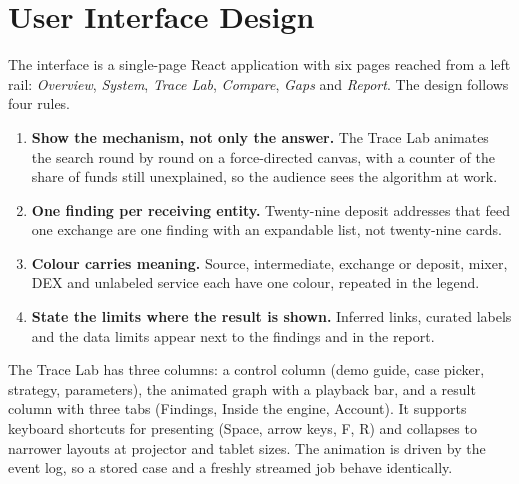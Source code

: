\section{User Interface Design}
\label{sec:design-group}
The interface is a single-page React application with six pages reached from a left rail: \emph{Overview}, \emph{System}, \emph{Trace Lab}, \emph{Compare}, \emph{Gaps} and \emph{Report}. The design follows four rules.
\begin{enumerate}
\item \textbf{Show the mechanism, not only the answer.} The Trace Lab animates the search round by round on a force-directed canvas, with a counter of the share of funds still unexplained, so the audience sees the algorithm at work.
\item \textbf{One finding per receiving entity.} Twenty-nine deposit addresses that feed one exchange are one finding with an expandable list, not twenty-nine cards.
\item \textbf{Colour carries meaning.} Source, intermediate, exchange or deposit, mixer, DEX and unlabeled service each have one colour, repeated in the legend.
\item \textbf{State the limits where the result is shown.} Inferred links, curated labels and the data limits appear next to the findings and in the report.
\end{enumerate}
The Trace Lab has three columns: a control column (demo guide, case picker, strategy, parameters), the animated graph with a playback bar, and a result column with three tabs (Findings, Inside the engine, Account). It supports keyboard shortcuts for presenting (Space, arrow keys, F, R) and collapses to narrower layouts at projector and tablet sizes. The animation is driven by the event log, so a stored case and a freshly streamed job behave identically.
